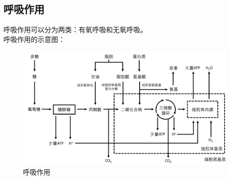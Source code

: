 \documentclass[UTF8]{ctexart}
\begin{document}
\newpage
    
\subsection{呼吸作用}
    呼吸作用可以分为两类：有氧呼吸和无氧呼吸。\\[3mm]
    呼吸作用的示意图：
    \begin{figure}[h!]
        \begin{center}
            \includegraphics[width=11cm]{BiologyImage/13.jpg}
            \caption{呼吸作用}
        \end{center}
    \end{figure}\vspace{-30pt}
    
\end{document}
